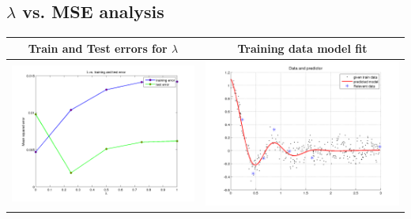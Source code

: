 \documentclass[fleqn]{article}
\begin{document}
\subsection{$\lambda$ vs. MSE analysis}

\begin{center}
  \begin{longtable}{ c | c }
	\multicolumn{1}{c}{Train and Test errors for $\lambda$} & 
	\multicolumn{1}{c}{Training data model fit}  \\
    \hline
    \includegraphics[scale=0.4]{./pics/task5/rvr_train and test error.png}  & \includegraphics[scale=0.4]{./pics/task5/rvc_predicted_lambda=0.25007.png} \\
    \hline
  \end{longtable}
\end{center}
\end{document}
